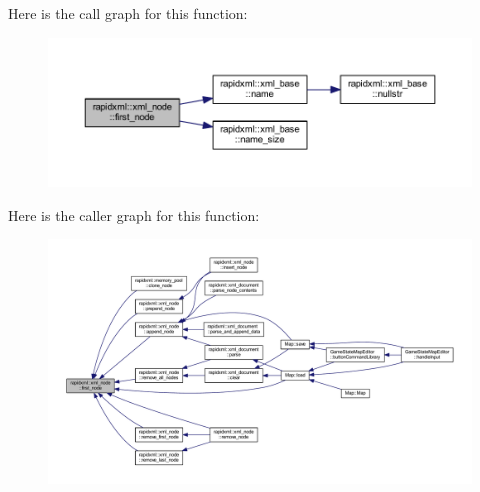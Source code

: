 Here is the call graph for this function\+:\nopagebreak
\begin{figure}[H]
\begin{center}
\leavevmode
\includegraphics[width=350pt]{singletonrapidxml_1_1xml__node_a2dedeb4e04bb35e06a9a7bddf6ba652d_cgraph}
\end{center}
\end{figure}




Here is the caller graph for this function\+:\nopagebreak
\begin{figure}[H]
\begin{center}
\leavevmode
\includegraphics[width=350pt]{singletonrapidxml_1_1xml__node_a2dedeb4e04bb35e06a9a7bddf6ba652d_icgraph}
\end{center}
\end{figure}


